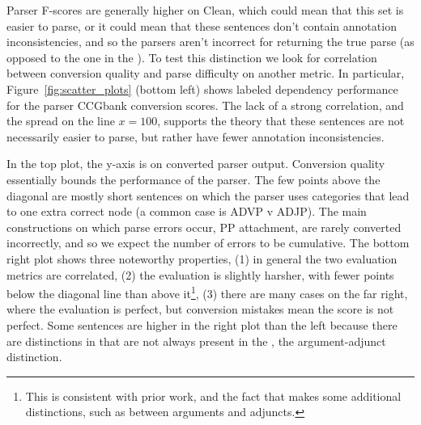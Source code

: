 Parser F-scores are generally higher on Clean, which could mean that this
set is easier to parse, or it could mean that these sentences don't contain
annotation inconsistencies, and so the parsers aren't incorrect for returning
the true parse (as opposed to the one in the \ptb).  To test this distinction
we look for correlation between conversion quality and parse difficulty on
another metric.  In particular, Figure~\ref{fig:scatter_plots} (bottom left) shows
\ccg labeled dependency performance for the \candc parser \myvs CCGbank
conversion \parseval scores. The lack of a strong correlation, and the spread
on the line $x=100$, supports the theory that these sentences are not
necessarily easier to parse, but rather have fewer annotation inconsistencies.

In the top plot, the y-axis is \parseval on converted \candc parser output.
Conversion quality essentially bounds the performance of the parser.
The few points above the diagonal are mostly short sentences on which the \candc parser uses categories that lead to one extra correct node (a common case is ADVP v ADJP).
The main constructions on which parse errors occur, \myeg PP attachment, are rarely converted incorrectly, and so we expect the number of errors to be cumulative.
The bottom right plot shows three noteworthy properties, (1) in general the two evaluation metrics are correlated, (2) the \ccg evaluation is slightly harsher, with fewer points below the diagonal line than above it\footnote{This is consistent with prior work, and the fact that \ccg makes some additional distinctions, such as between arguments and adjuncts.}, (3) there are many cases on the far right, where the \ccg evaluation is perfect, but conversion mistakes mean the \ptb score is not perfect.
Some sentences are higher in the right plot than the left because there are distinctions in \ccg that are not always present in the \ptb, \myeg the argument-adjunct distinction.

